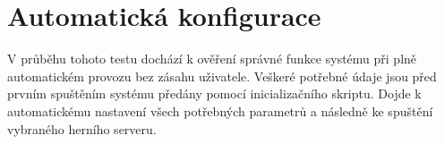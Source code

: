 \section{Automatická konfigurace}

V průběhu tohoto testu dochází k ověření správné funkce systému při plně automatickém provozu bez zásahu uživatele.
Veškeré potřebné údaje jsou před prvním spuštěním systému předány pomocí inicializačního skriptu. Dojde k automatickému nastavení
všech potřebných parametrů a následně ke spuštění vybraného herního serveru. 
